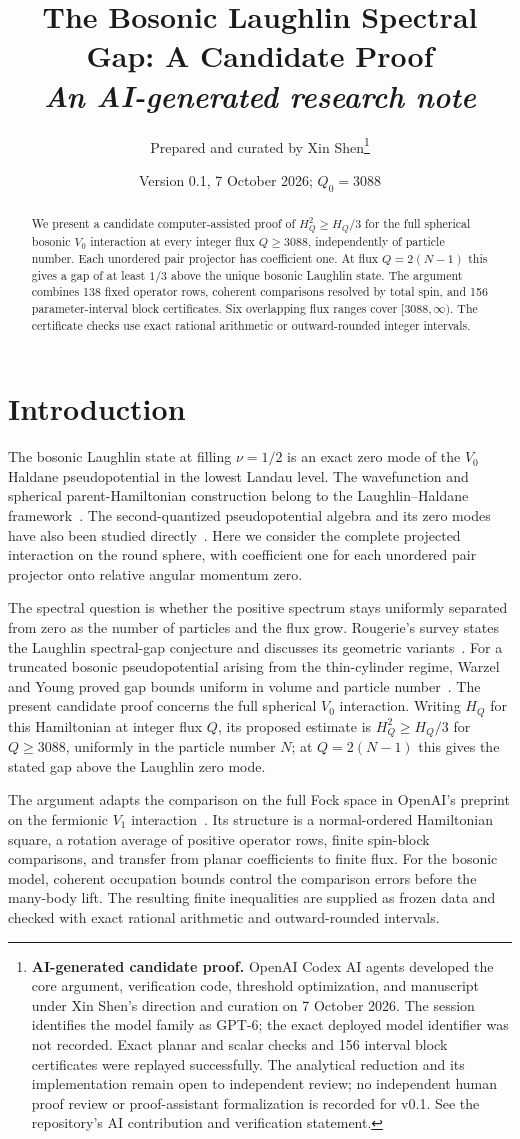 \documentclass[11pt]{article}
\title{The Bosonic Laughlin Spectral Gap: A Candidate Proof\\[0.5em]\large\textit{An AI-generated research note}}
\author{\normalsize Prepared and curated by Xin Shen\thanks{\textbf{AI-generated candidate proof.}
OpenAI Codex AI agents developed the core argument, verification code,
threshold optimization, and manuscript under Xin Shen's direction and
curation on 7 October 2026. The session identifies the model family as
GPT-6; the exact deployed model identifier was not recorded.
Exact planar and scalar checks and 156 interval block certificates were
replayed successfully. The analytical reduction and its implementation
remain open to independent review; no independent human proof review or
proof-assistant formalization is recorded for v0.1.
See the repository's AI contribution and verification statement.}}
\date{Version 0.1, 7 October 2026; $Q_0=3088$}
\begin{document}
\maketitle
\begin{abstract}
We present a candidate computer-assisted proof of $H_Q^2\ge H_Q/3$ for the full spherical
bosonic $V_0$ interaction at every integer flux $Q\ge3088$, independently
of particle number. Each unordered pair projector has coefficient one.
At flux $Q=2(N-1)$ this gives a gap of at least $1/3$ above the unique
bosonic Laughlin state. The argument combines 138 fixed operator rows,
coherent comparisons resolved by total spin, and 156 parameter-interval
block certificates. Six overlapping flux ranges cover $[3088,\infty)$.
The certificate checks use exact rational arithmetic or outward-rounded
integer intervals.
\end{abstract}

\section*{Introduction}
The bosonic Laughlin state at filling $\nu=1/2$ is an exact zero mode of
the $V_0$ Haldane pseudopotential in the lowest Landau level. The
wavefunction and spherical parent-Hamiltonian construction belong to the
Laughlin--Haldane framework~\cite{Laughlin1983,Haldane1983}. The
second-quantized pseudopotential algebra and its zero modes have also been
studied directly~\cite{OrtizEtAl2013,ChenSeidel2015}. Here we consider the
complete projected interaction on the round sphere, with coefficient one
for each unordered pair projector onto relative angular momentum zero.

The spectral question is whether the positive spectrum stays uniformly
separated from zero as the number of particles and the flux grow.
Rougerie's survey states the Laughlin spectral-gap conjecture and discusses
its geometric variants~\cite[Appendix~A]{Rougerie2019}. For a truncated
bosonic pseudopotential arising from the thin-cylinder regime, Warzel and
Young proved gap bounds uniform in volume and particle
number~\cite{WarzelYoung2023}. The present candidate proof concerns the
full spherical $V_0$ interaction. Writing $H_Q$ for this Hamiltonian at integer flux $Q$, its proposed
estimate is $H_Q^2\ge H_Q/3$ for $Q\ge3088$, uniformly in the particle
number $N$; at $Q=2(N-1)$ this gives the stated gap above the Laughlin zero mode.

The argument adapts the comparison on the full Fock space in
OpenAI's preprint on the fermionic $V_1$ interaction~\cite{OpenAI2026}. Its structure
is a normal-ordered Hamiltonian square, a rotation average of positive
operator rows, finite spin-block comparisons, and transfer from planar
coefficients to finite flux. For the bosonic model, coherent occupation
bounds control the comparison errors before the many-body lift. The
resulting finite inequalities are supplied as frozen data and checked with
exact rational arithmetic and outward-rounded intervals.
\end{document}

